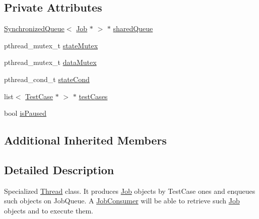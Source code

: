 \subsection*{Private Attributes}
\begin{DoxyCompactItemize}
\item 
\hyperlink{classit_1_1testbench_1_1rte_1_1SynchronizedQueue}{Synchronized\-Queue}$<$ \hyperlink{classit_1_1testbench_1_1rte_1_1Job}{Job} $\ast$ $>$ $\ast$ \hyperlink{classit_1_1testbench_1_1rte_1_1JobProducer_a10a14d85ca5c22ff91f92ebf32d4801a}{shared\-Queue}
\item 
pthread\-\_\-mutex\-\_\-t \hyperlink{classit_1_1testbench_1_1rte_1_1JobProducer_a057bd5b0f3f2debd4d4decedd97a3dde}{state\-Mutex}
\item 
pthread\-\_\-mutex\-\_\-t \hyperlink{classit_1_1testbench_1_1rte_1_1JobProducer_aa518f9cd4f229ed05e4e264152ac6fd4}{data\-Mutex}
\item 
pthread\-\_\-cond\-\_\-t \hyperlink{classit_1_1testbench_1_1rte_1_1JobProducer_a338c98f3baf25a38aac0b61052654d01}{state\-Cond}
\item 
list$<$ \hyperlink{classit_1_1testbench_1_1data_1_1TestCase}{Test\-Case} $\ast$ $>$ $\ast$ \hyperlink{classit_1_1testbench_1_1rte_1_1JobProducer_a04ec295961ab5dcc1c8caadf6cb30e46}{test\-Cases}
\item 
bool \hyperlink{classit_1_1testbench_1_1rte_1_1JobProducer_af3876f44c46fc6b41a50a2171e3c3ba8}{is\-Paused}
\end{DoxyCompactItemize}
\subsection*{Additional Inherited Members}


\subsection{Detailed Description}
Specialized \hyperlink{classit_1_1testbench_1_1rte_1_1Thread}{Thread} class. It produces \hyperlink{classit_1_1testbench_1_1rte_1_1Job}{Job} objects by Test\-Case ones and enqueues such objects on Job\-Queue. A \hyperlink{classit_1_1testbench_1_1rte_1_1JobConsumer}{Job\-Consumer} will be able to retrieve such \hyperlink{classit_1_1testbench_1_1rte_1_1Job}{Job} objects and to execute them. 

